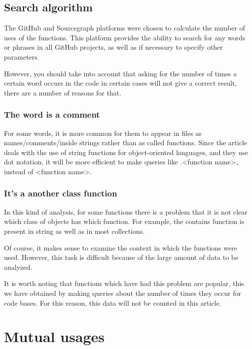 \documentclass[anonymous,sigplan,review,11pt,nonacm,natbib=false]{acmart}
\begin{document}
    \subsection{Search algorithm}

    The GitHub and Sourcegraph platforms were chosen to calculate the number of uses of the functions. This platform provides the ability to search for any words or phrases in all GitHub projects, as well as if necessary to specify other parameters.

    However, you should take into account that asking for the number of times a certain word occurs in the code in certain cases will not give a correct result, there are a number of reasons for that.

    \subsubsection{The word is a comment} \hl{}

    For some words, it is more common for them to appear in files as names/comments/inside strings rather than as called functions. Since the article deals with the use of string functions for object-oriented languages, and they use dot notation, it will be more efficient to make queries like .<function name>, instead of <function name>.

    \subsubsection{It's a another class function} \hl{}

    In this kind of analysis, for some functions there is a problem that it is not clear which class of objects has which function. For example, the contains function is present in string as well as in most collections.

    Of course, it makes sense to examine the context in which the functions were used. However, this task is difficult because of the large amount of data to be analyzed.

    It is worth noting that functions which have had this problem are popular, this we have obtained by making queries about the number of times they occur for code bases. For this reason, this data will not be counted in this article.

    \section{Mutual usages}
\end{document}
